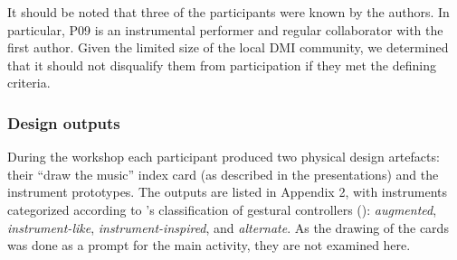\documentclass[letterpaper, 12pt]{article}
\begin{document}
It should be noted that three of the participants were known by the authors. In particular, P09 is an instrumental performer and regular collaborator with the first author. Given the limited size of the local DMI community, we determined that it should not disqualify them from participation if they met the defining criteria.

\subsubsection{Design outputs}
\label{ch3-sec:design-outputs}

During the workshop each participant produced two physical design artefacts: their ``draw the music'' index card (as described in the presentations) and the instrument prototypes. The outputs are listed in Appendix 2, with instruments categorized according to \citeauthor{Miranda2006a}'s classification of gestural controllers (\citeyear{Miranda2006a}): \emph{augmented}, \emph{instrument-like}, \emph{instrument-inspired}, and \emph{alternate}. As the drawing of the cards was done as a prompt for the main activity, they are not examined here. 


\end{document}
